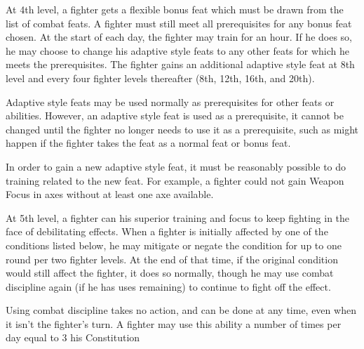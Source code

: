  At 4th level, a fighter gets a flexible bonus feat
which must be drawn from the list of combat feats. A fighter must still
meet all prerequisites for any bonus feat chosen. At the start of each day, the fighter may train for an hour. If he does so, he may choose to change his adaptive style feats to any other feats for which he meets the prerequisites.
The fighter gains an additional adaptive style feat at 8th level and every four fighter levels thereafter (8th, 12th, 16th, and 20th).
\par Adaptive style feats may be used normally as prerequisites for other feats or abilities.
However, an adaptive style feat is used as a prerequisite, it cannot be changed until the
fighter no longer needs to use it as a prerequisite, such as might happen if the fighter takes
the feat as a normal feat or bonus feat.
\par In order to gain a new adaptive style feat, it must be reasonably possible to do training related to the new feat. For example, a fighter could not gain Weapon Focus in axes without at least one axe available.

 At 5th level, a fighter can his superior training and focus to keep fighting in the face of debilitating effects. When a fighter is initially affected by one of the conditions listed below, he may mitigate or negate the condition for up to one round per two fighter levels. At the end of that time, if the original condition would still affect the fighter, it does so normally, though he may use combat discipline again (if he has uses remaining) to continue to fight off the effect.
\par Using combat discipline takes no action, and can be done at any time, even when it isn't the fighter's turn. A fighter may use this ability a number of times per day equal to 3 \add his Constitution

